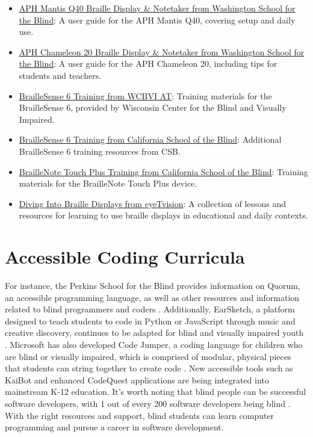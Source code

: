 \begin{itemize}
\item \href{https://view.officeapps.live.com/op/view.aspx?src=https\%3A\%2F\%2Fwww.wssb.wa.gov\%2Fsites\%2Fdefault\%2Ffiles\%2F2021-10\%2FUsing\%2520APH\%2520Mantis\%2520Q40.docx&wdOrigin=BROWSELINK}{APH Mantis Q40 Braille Display \& Notetaker from Washington School for the Blind}: A user guide for the APH Mantis Q40, covering setup and daily use.
\item \href{https://view.officeapps.live.com/op/view.aspx?src=https\%3A\%2F\%2Fwww.wssb.wa.gov\%2Fsites\%2Fdefault\%2Ffiles\%2F2023-07\%2FUsing\%2520APH\%2520Chameleon\%252020.docx&wdOrigin=BROWSELINK}{APH Chameleon 20 Braille Display \& Notetaker from Washington School for the Blind}: A user guide for the APH Chameleon 20, including tips for students and teachers.
\item \href{https://drive.google.com/drive/folders/1V\_hXjrsDeKUbNImA6Q77joADQbqMKKKl}{BrailleSense 6 Training from WCBVI AT}: Training materials for the BrailleSense 6, provided by Wisconsin Center for the Blind and Visually Impaired.
\item \href{https://drive.google.com/drive/folders/10HeixUb4E21nPLCStmnrsxLVehKThPP}{BrailleSense 6 Training from California School of the Blind}: Additional BrailleSense 6 training resources from CSB.
\item \href{https://drive.google.com/drive/folders/1OKBBdjbbD6asrE4dYyP7do9EWvY--5wf}{BrailleNote Touch Plus Training from California School of the Blind}: Training materials for the BrailleNote Touch Plus device.
\item \href{https://eyetvision.org/}{Diving Into Braille Displays from eyeTvision}: A collection of lessons and resources for learning to use braille displays in educational and daily contexts.
\end{itemize}

\hypertarget{appx8}{}\section[Accessible Coding Curricula]{Accessible Coding Curricula}\label{appx8}
For instance, the Perkins School for the Blind provides information on Quorum, an accessible programming language, as well as other resources and information related to blind programmers and coders \cite{PerkinsQuorum}. Additionally, EarSketch, a platform designed to teach students to code in Python or JavaScript through music and creative discovery, continues to be adapted for blind and visually impaired youth \cite{EarSketchGT}. Microsoft has also developed Code Jumper, a coding language for children who are blind or visually impaired, which is comprised of modular, physical pieces that students can string together to create code \cite{MSCodeJumper}. New accessible tools such as KaiBot and enhanced CodeQuest applications are being integrated into mainstream K-12 education. It's worth noting that blind people can be successful software developers, with 1 out of every 200 software developers being blind \cite{FreeCodeCamp2017}. With the right resources and support, blind students can learn computer programming and pursue a career in software development. \cite{HadwenBennett2018,Alotaibi2020}

